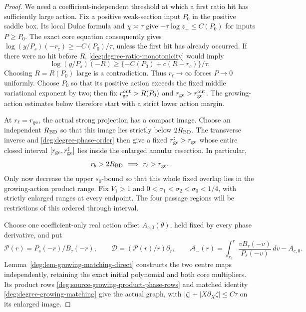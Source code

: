 \begin{proof}
We need a coefficient-independent threshold at which a first ratio
hit has sufficiently large action.  Fix a positive weak-section input \(P_0\) in
the positive saddle box.  Its local Dulac formula and
\(\chi\asymp\tau\) give
\(-\tau\log z_+\le C(P_0)\) for inputs \(P\ge P_0\).
The exact core equation consequently gives
\(\log(y/P_s)(-r_c)\ge-C(P_0)/\tau\), unless the first hit
has already occurred.  If there were no hit before \(R\),
\eqref{deg:degree-ratio-monotonicity} would imply
\[
 \log(y/P_s)(-R)\ge
             \{-C(P_0)+c(R-r_c)\}/\tau.
\]
Choosing \(R=R(P_0)\) large is a contradiction.  Thus
\(r_\ell\to\infty\) forces \(P\to0\) uniformly.  Choose
\(P_0\) so that its positive action exceeds the fixed middle
variational exponent by two; then fix
\(r_{\rm ge}^{\rm out}>R(P_0)\) and
\(r_{\rm ge}>r_{\rm ge}^{\rm out}\).  The growing-action estimates below therefore start with a strict lower
action margin.

At \(r_\ell=r_{\rm ge}\), the actual strong projection has a
compact image.  Choose an independent \(R_{\rm BD}\) so that
this image lies strictly below \(2R_{\rm BD}\).  The transverse
inverse and \eqref{deg:degree-phase-order} then give a fixed
\(r_{\rm ge}^{\sharp}>r_{\rm ge}\) whose entire closed interval
\([r_{\rm ge},r_{\rm ge}^{\sharp}]\) lies inside the enlarged
annular resection.  In particular,
\[
 r_b>2R_{\rm BD}\ \Longrightarrow\ r_\ell>r_{\rm ge}.
\]
Only now decrease the upper \(s_0\)-bound so that this whole fixed
overlap lies in the growing-action product range.  Fix \(V_1>1\) and
\(0<\sigma_1<\sigma_2<\sigma_0<1/4\), with
strictly enlarged ranges at every endpoint.
The four passage regions will be restrictions of this ordered through
interval.

Choose one coefficient-only real action offset \(A_{c,0}(\theta)\),
held fixed by every phase derivative, and put
\[
 \mathcal P(r)=P_s(-r)/B_\tau(-r),\qquad
 \mathcal D=(\mathcal P(r)/r)\partial_r,\qquad
 \mathcal A_-(r)=\int_{r_c}^r\frac{vB_\tau(-v)}{P_s(-v)}\,dv-A_{c,0}.
\]
Lemma~\ref{deg:lem-growing-matching-direct} constructs the two
centre maps independently, retaining the exact initial polynomial
and both core multipliers. Its product rows
\eqref{deg:source-growing-product-phase-rows} and matched identity
\eqref{deg:degree-growing-matching} give the actual graph, with
\(|\zeta|+|X\partial_X\zeta|\le C\tau\) on its enlarged image.


\end{proof}

